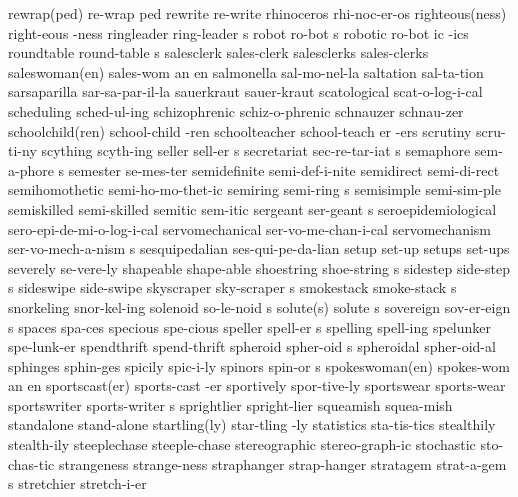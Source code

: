 \2 rewrap(ped)		re-wrap ped		%
\1 rewrite		re-write		%
\1 rhinoceros		rhi-noc-er-os
\2 righteous(ness)	right-eous -ness
\5 ringleader		ring-leader s
\5 robot		ro-bot s
\6 robotic		ro-bot ic -ics
\5 roundtable		round-table s
\1 salesclerk		sales-clerk
\1 salesclerks		sales-clerks
\3 saleswoman(en)	sales-wom an en
\1 salmonella		sal-mo-nel-la
\1 saltation		sal-ta-tion		%
\1 sarsaparilla		sar-sa-par-il-la
\1 sauerkraut		sauer-kraut
\1 scatological		scat-o-log-i-cal
\1 scheduling		sched-ul-ing
\1 schizophrenic	schiz-o-phrenic
\1 schnauzer		schnau-zer
\2 schoolchild(ren)	school-child -ren
\6 schoolteacher	school-teach er -ers
\1 scrutiny		scru-ti-ny		%
\1 scything		scyth-ing
\5 seller		sell-er s		%
\5 secretariat		sec-re-tar-iat s
\5 semaphore		sem-a-phore s
\1 semester		se-mes-ter
\1 semidefinite 	semi-def-i-nite
\1 semidirect		semi-di-rect		%
\1 semihomothetic	semi-ho-mo-thet-ic
\5 semiring		semi-ring s
\1 semisimple		semi-sim-ple		%
\1 semiskilled		semi-skilled
\1 semitic		sem-itic		%
\NewWordtrue
\5 sergeant		ser-geant s		%
\1 seroepidemiological	sero-epi-de-mi-o-log-i-cal
\NewWordtrue
\1 servomechanical	ser-vo-me-chan-i-cal	%
\5 servomechanism	ser-vo-mech-a-nism s
\1 sesquipedalian	ses-qui-pe-da-lian	%
\1 setup		set-up
\1 setups		set-ups
\1 severely		se-vere-ly
\1 shapeable		shape-able
\5 shoestring		shoe-string s
\5 sidestep		side-step s
\1 sideswipe		side-swipe
\5 skyscraper		sky-scraper s
\5 smokestack		smoke-stack s
\1 snorkeling		snor-kel-ing
\5 solenoid		so-le-noid s
\2 solute(s)		solute s
\5 sovereign		sov-er-eign s
\1 spaces		spa-ces
\1 specious		spe-cious
\5 speller		spell-er s		%
\1 spelling		spell-ing		%
\1 spelunker		spe-lunk-er
\1 spendthrift		spend-thrift
\5 spheroid		spher-oid s
\1 spheroidal		spher-oid-al
\1 sphinges		sphin-ges
\1 spicily		spic-i-ly
\5 spinors		spin-or s
\3 spokeswoman(en)	spokes-wom an en
\2 sportscast(er)	sports-cast -er
\1 sportively		spor-tive-ly
\1 sportswear		sports-wear
\5 sportswriter		sports-writer s
\1 sprightlier		spright-lier
\1 squeamish		squea-mish
\1 standalone		stand-alone
\2 startling(ly)	star-tling -ly
\1 statistics		sta-tis-tics
\1 stealthily		stealth-ily
\1 steeplechase		steeple-chase
\1 stereographic	stereo-graph-ic		%
\1 stochastic		sto-chas-tic
\1 strangeness		strange-ness
\1 straphanger		strap-hanger		%
\5 stratagem		strat-a-gem s
\1 stretchier		stretch-i-er
